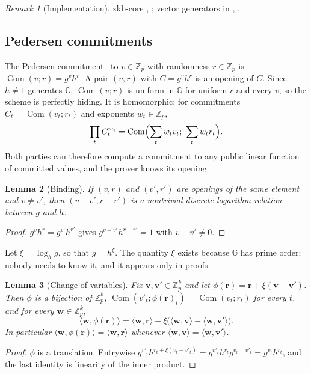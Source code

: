 \documentclass[11pt]{article}
\newtheorem{lemma}{Lemma}[section]
\theoremstyle{definition}
\theoremstyle{remark}
\newtheorem{remark}[lemma]{Remark}
\newcommand{\Z}{\mathbb{Z}}
\newcommand{\G}{\mathbb{G}}
\newcommand{\Com}{\operatorname{Com}}
\newcommand{\bv}{\mathbf}
\begin{document}
\begin{remark}[Implementation]\label{rem:impl-params}
zkb-core , ; vector generators in , .
\end{remark}

\subsection{Pedersen commitments}\label{sec:pedersen}
The Pedersen commitment~\cite{pedersen} to $v\in\Z_p$ with randomness $r\in\Z_p$ is $\Com(v;r)=g^vh^r$. A pair $(v,r)$ with $C=g^vh^r$ is an opening of $C$. Since $h\ne1$ generates $\G$, $\Com(v;r)$ is uniform in $\G$ for uniform $r$ and every $v$, so the scheme is perfectly hiding. It is homomorphic: for commitments $C_t=\Com(v_t;r_t)$ and exponents $w_t\in\Z_p$,
\begin{equation}
  \prod_t C_t^{w_t}=\Com\Bigl(\sum_t w_tv_t;\ \sum_t w_tr_t\Bigr).
  \label{eq:hom}
\end{equation}
Both parties can therefore compute a commitment to any public linear function of committed values, and the prover knows its opening.

\begin{lemma}[Binding]\label{lem:binding}
If $(v,r)$ and $(v',r')$ are openings of the same element and $v\ne v'$, then $(v-v',r-r')$ is a nontrivial discrete logarithm relation between $g$ and $h$.
\end{lemma}
\begin{proof}
$g^vh^r=g^{v'}h^{r'}$ gives $g^{v-v'}h^{r-r'}=1$ with $v-v'\ne0$.
\end{proof}

Let $\xi=\log_hg$, so that $g=h^\xi$. The quantity $\xi$ exists because $\G$ has prime order; nobody needs to know it, and it appears only in proofs.

\begin{lemma}[Change of variables]\label{lem:coupling}
Fix $\bv v,\bv v'\in\Z_p^k$ and let $\phi(\bv r)=\bv r+\xi(\bv v-\bv v')$. Then $\phi$ is a bijection of $\Z_p^k$, $\Com(v'_t;\phi(\bv r)_t)=\Com(v_t;r_t)$ for every $t$, and for every $\bv w\in\Z_p^k$,
\[
  \langle\bv w,\phi(\bv r)\rangle=\langle\bv w,\bv r\rangle+\xi\bigl(\langle\bv w,\bv v\rangle-\langle\bv w,\bv v'\rangle\bigr).
\]
In particular $\langle\bv w,\phi(\bv r)\rangle=\langle\bv w,\bv r\rangle$ whenever $\langle\bv w,\bv v\rangle=\langle\bv w,\bv v'\rangle$.
\end{lemma}
\begin{proof}
$\phi$ is a translation. Entrywise $g^{v'_t}h^{r_t+\xi(v_t-v'_t)}=g^{v'_t}h^{r_t}g^{v_t-v'_t}=g^{v_t}h^{r_t}$, and the last identity is linearity of the inner product.
\end{proof}
\end{document}
